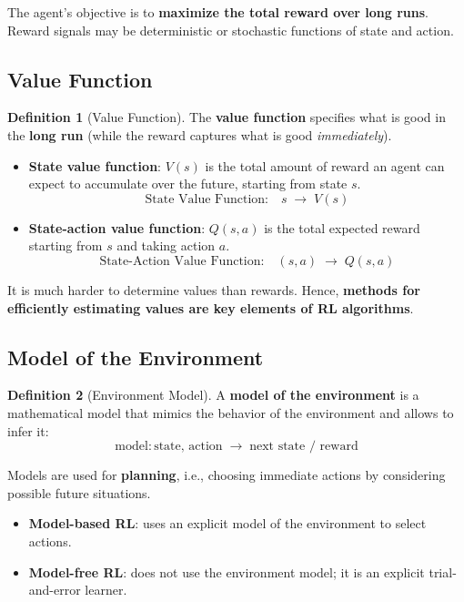 \documentclass[11pt,a4paper]{article}
\theoremstyle{definition}
\newtheorem{definition}{Definition}[section]
\theoremstyle{plain}
\theoremstyle{remark}
\begin{document}
The agent's objective is to \textbf{maximize the total reward over long runs}. Reward signals may be deterministic or stochastic functions of state and action.

\subsection{Value Function}

\begin{definition}[Value Function]
The \textbf{value function} specifies what is good in the \textbf{long run} (while the reward captures what is good \textit{immediately}).
\begin{itemize}
    \item \textbf{State value function}: $V(s)$ is the total amount of reward an agent can expect to accumulate over the future, starting from state $s$.
    \[\text{State Value Function:}\quad s \;\to\; V(s)\]
    \item \textbf{State-action value function}: $Q(s,a)$ is the total expected reward starting from $s$ and taking action $a$.
    \[\text{State-Action Value Function:}\quad (s, a) \;\to\; Q(s,a)\]
\end{itemize}
\end{definition}

It is much harder to determine values than rewards. Hence, \textbf{methods for efficiently estimating values are key elements of RL algorithms}.

\subsection{Model of the Environment}

\begin{definition}[Environment Model]
A \textbf{model of the environment} is a mathematical model that mimics the behavior of the environment and allows to infer it:
\[
    \text{model}: \text{state},\, \text{action} \;\to\; \text{next state / reward}
\]
\end{definition}

Models are used for \textbf{planning}, i.e., choosing immediate actions by considering possible future situations.

\begin{itemize}
    \item \textbf{Model-based RL}: uses an explicit model of the environment to select actions.
    \item \textbf{Model-free RL}: does not use the environment model; it is an explicit trial-and-error learner.
\end{itemize}
\end{document}
